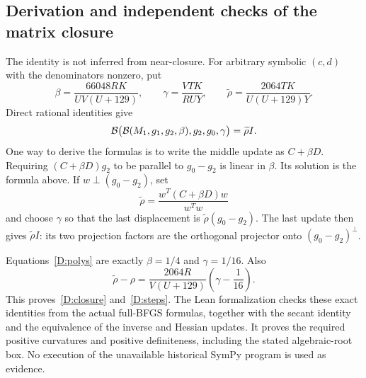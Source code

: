 

\subsection{Derivation and independent checks of the matrix closure}
The identity is not inferred from near-closure. For arbitrary symbolic $(c,d)$ with the denominators nonzero, put
\[
 \beta=\frac{66048RK}{UV(U+129)},\qquad
 \gamma=\frac{VTK}{RUY},\qquad
 \widetilde\rho=\frac{2064TK}{U(U+129)Y}.
\]
Direct rational identities give
\[
 \mathcal B\bigl(\mathcal B(M_1,g_1,g_2,\beta),g_2,g_0,\gamma\bigr)
 =\widetilde\rho I.
\]
One way to derive the formulas is to write the middle update as $C+\beta D$. Requiring $(C+\beta D)g_2$ to be parallel to $g_0-g_2$ is linear in $\beta$. Its solution is the formula above. If $w\perp(g_0-g_2)$, set
\[
 \widetilde\rho=\frac{w^T(C+\beta D)w}{w^Tw}
\]
and choose $\gamma$ so that the last displacement is $\widetilde\rho(g_0-g_2)$. The last update then gives $\widetilde\rho I$: its two projection factors are the orthogonal projector onto $(g_0-g_2)^\perp$.

Equations~\eqref{D:polys} are exactly $\beta=1/4$ and $\gamma=1/16$. Also
\[
 \widetilde\rho-\rho
 =\frac{2064R}{V(U+129)}\left(\gamma-\frac1{16}\right).
\]
This proves~\eqref{D:closure} and~\eqref{D:steps}. The Lean formalization checks these exact identities from the actual full-BFGS formulas, together with the secant identity and the equivalence of the inverse and Hessian updates. It proves the required positive curvatures and positive definiteness, including the stated algebraic-root box. No execution of the unavailable historical SymPy program is used as evidence.


\setcounter{section}{2}
\setcounter{theorem}{1}
\setcounter{lemma}{1}
\setcounter{corollary}{0}
\setcounter{proposition}{0}
\setcounter{remark}{0}
\setcounter{equation}{6}


